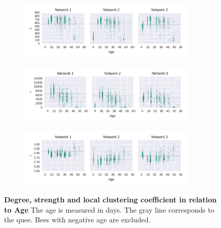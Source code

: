 \begin{figure}[htb]
	\centering
	\begin{subfigure}[b]{1.0\textwidth}
	\centering
	\includegraphics[width=0.92\textwidth]{Figures/stat-degreeAge}
	\label{fig:degreeAge}
	\end{subfigure} 
	\begin{subfigure}[b]{1.0\textwidth}
	\centering
	\includegraphics[width=0.92\textwidth]{Figures/stat-strengthAge}
	\label{fig:strengthAge}
	\end{subfigure}
	\begin{subfigure}[b]{1.0\textwidth}
	\centering
	\includegraphics[width=0.92\textwidth]{Figures/stat-lccAge}
	\label{fig:lccsAge}
	\end{subfigure}
	\caption[Degree, strength and local clustering coefficient in relation to Age]{\textbf{Degree, strength and local clustering coefficient in relation to Age} The age is measured in days. The gray line corresponds to the quee. Bees with negative age are excluded.}
	\label{fig:degstrlcc}
\end{figure}


